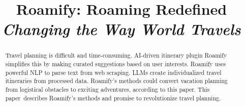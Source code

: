 \documentclass[conference]{IEEEtran}
\begin{document}
\title{\textbf{Roamify: Roaming Redefined}\\ \textit{Changing the Way World Travels}}


\author{
\and
{}
\and
{}
\and
{}
\and
{}
\and
{}
}








\maketitle

\begin{abstract}

    Travel planning is difficult and time-consuming. AI-driven itinerary plugin Roamify simplifies this by making curated suggestions based on user interests. Roamify uses powerful NLP to parse text from web scraping. LLMs create individualized travel itineraries from processed data. Roamify's methods could convert vacation planning from logistical obstacles to exciting adventures, according to this paper. This paper describes Roamify's methods and promise to revolutionize travel planning.

\end{abstract}
\end{document}
